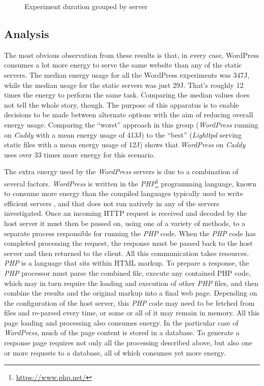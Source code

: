 \begin{figure}[htbp]
  \centering
  
  \caption{Experiment duration grouped by server}
  \label{Server Time}
\end{figure}

\subsection{Analysis}
\label{servers:analysis}

The most obvious observation from these results is that, in every case, WordPress consumes a lot more energy to serve the same website than any of the static servers. The median energy usage for all the WordPress experiments was 347J, while the median usage for the static servers was just 29J. That's roughly 12 times the energy to perform the same task. Comparing the median values does not tell the whole story, though. The purpose of this apparatus is to enable decisions to be made between alternate options with the aim of reducing overall energy usage. Comparing the \enquote{worst} approach in this group (\emph{WordPress} running on \emph{Caddy} with a mean energy usage of 413J) to the \enquote{best} (\emph{Lighttpd} serving static files with a mean energy usage of 12J) shows that \emph{WordPress} on \emph{Caddy} uses over 33 times more energy for this scenario.

The extra energy used by the \emph{WordPress} servers is due to a combination of several factors. \emph{WordPress} is written in the \emph{PHP}\footnote{\url{https://www.php.net/}} \gls{programming language}, known to consume more energy than the compiled languages typically used to write efficient servers \citep{Pereira2017} \citep{Pereira2021}, and that does not run natively in any of the servers investigated. Once an incoming HTTP request is received and decoded by the host server it must then be passed on, using one of a variety of methods, to a separate process responsible for running the \emph{PHP} code. When the \emph{PHP} code has completed processing the request, the response must be passed back to the host server and then returned to the client. All this communication takes resources. \emph{PHP} is a language that sits within HTML markup. To prepare a response, the \emph{PHP} processor must parse the combined file, execute any contained PHP code, which may in turn require the loading and execution of other \emph{PHP} files, and then combine the results and the original markup into a final web page. Depending on the configuration of the host server, this \emph{PHP} code may need to be fetched from files and re-parsed every time, or some or all of it may remain in memory. All this page loading and processing also consumes energy. In the particular case of \emph{WordPress}, much of the page content is stored in a database. To generate a response page requires not only all the processing described above, but also one or more requests to a database, all of which consumes yet more energy.

